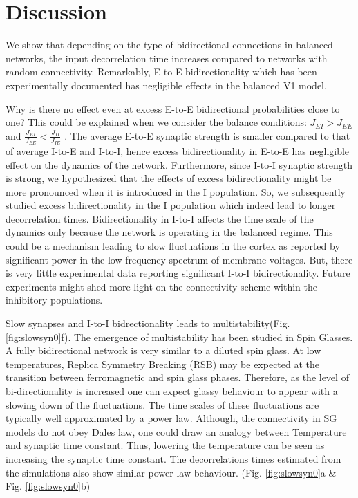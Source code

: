 \section{Discussion}
We show that depending on the type of bidirectional connections in balanced networks, the input decorrelation time increases compared to networks with random connectivity. Remarkably, E-to-E bidirectionality which has been experimentally documented has negligible effects in the balanced V1 model. 

Why is there no effect even at excess E-to-E bidirectional probabilities close to one?  This could be explained when we consider the balance conditions: $J_{EI} > J_{EE}$ and $\frac{J_{EI}}{J_{EE}} < \frac{J_{II}}{J_{IE}}$ \cite{carl1998}. The average E-to-E synaptic strength is smaller compared to that of average I-to-E and I-to-I, hence excess bidirectionality in E-to-E has negligible effect on the dynamics of the network. Furthermore, since I-to-I synaptic strength is strong, we hypothesized that the effects of excess bidirectionality might be more pronounced when it is introduced in the I population. So, we subsequently studied excess bidirectionality in the I population which indeed lead to longer decorrelation times. Bidirectionality in I-to-I affects the time scale of the dynamics only because the network is operating in the balanced regime. This could be a mechanism leading to slow fluctuations in the cortex as reported by significant power in the low frequency spectrum of membrane voltages. But, there is very little experimental data reporting significant I-to-I bidirectionality. Future experiments might shed more light on the connectivity scheme within the inhibitory populations.

Slow synapses and I-to-I bidrectionality leads to multistability(Fig. \ref{fig:slowsyn0}f). The emergence of multistability has been studied in Spin Glasses. A fully bidirectional network is very similar to a diluted spin glass\cite{megard1987spin}. At low temperatures, Replica Symmetry Breaking (RSB) may be expected at the transition between ferromagnetic and spin glass phases. Therefore, as the level of bi-directionality is increased one can expect glassy behaviour to appear with a slowing down of the fluctuations\cite{Crisanti1987, Crisanti1988}. The time scales of these fluctuations are typically well approximated by a power law. Although, the connectivity in SG models do not obey Dales law, one could draw an analogy between Temperature and synaptic time constant. Thus, lowering the temperature can be seen as increasing the synaptic time constant. The decorrelations times estimated from the simulations also show similar power law behaviour. (Fig. \ref{fig:slowsyn0}a \& Fig. \ref{fig:slowsyn0}b) \\

